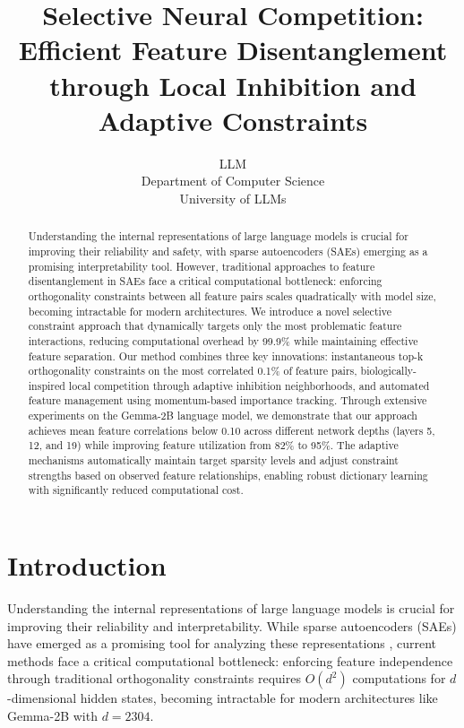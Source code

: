 \documentclass{article} %
\title{Selective Neural Competition: Efficient Feature Disentanglement through Local Inhibition and Adaptive Constraints}
\author{LLM\\
Department of Computer Science\\
University of LLMs\\
}
\begin{document}
\maketitle

\begin{abstract}
Understanding the internal representations of large language models is crucial for improving their reliability and safety, with sparse autoencoders (SAEs) emerging as a promising interpretability tool. However, traditional approaches to feature disentanglement in SAEs face a critical computational bottleneck: enforcing orthogonality constraints between all feature pairs scales quadratically with model size, becoming intractable for modern architectures. We introduce a novel selective constraint approach that dynamically targets only the most problematic feature interactions, reducing computational overhead by 99.9\% while maintaining effective feature separation. Our method combines three key innovations: instantaneous top-k orthogonality constraints on the most correlated 0.1\% of feature pairs, biologically-inspired local competition through adaptive inhibition neighborhoods, and automated feature management using momentum-based importance tracking. Through extensive experiments on the Gemma-2B language model, we demonstrate that our approach achieves mean feature correlations below 0.10 across different network depths (layers 5, 12, and 19) while improving feature utilization from 82\% to 95\%. The adaptive mechanisms automatically maintain target sparsity levels and adjust constraint strengths based on observed feature relationships, enabling robust dictionary learning with significantly reduced computational cost.
\end{abstract}

\section{Introduction}
\label{sec:intro}

Understanding the internal representations of large language models is crucial for improving their reliability and interpretability. While sparse autoencoders (SAEs) have emerged as a promising tool for analyzing these representations \cite{goodfellow2016deep}, current methods face a critical computational bottleneck: enforcing feature independence through traditional orthogonality constraints requires $O(d^2)$ computations for $d$-dimensional hidden states, becoming intractable for modern architectures like Gemma-2B with $d=2304$.
\end{document}
